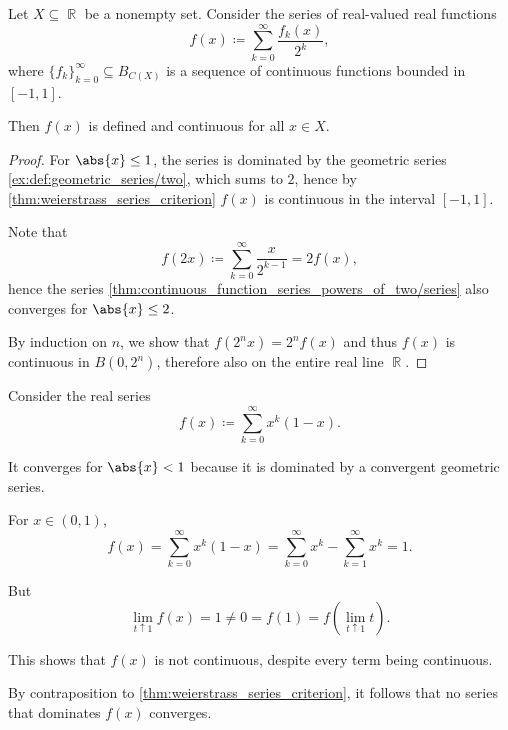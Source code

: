 \begin{corollary}\label{thm:continuous_function_series_powers_of_two}
  Let \( X \subseteq \BbbR \) be a nonempty set. Consider the series of real-valued real functions
  \begin{equation}\label{thm:continuous_function_series_powers_of_two/series}
    f(x) \coloneqq \sum_{k=0}^\infty \frac {f_k(x)} {2^k},
  \end{equation}
  where \( \{ f_k \}_{k=0}^\infty \subseteq B_{C(X)} \) is a sequence of continuous functions bounded in \( [-1, 1] \).

  Then \( f(x) \) is defined and continuous for all \( x \in X \).
\end{corollary}
\begin{proof}
  For \( \abs{x} \leq 1 \), the series is dominated by the geometric series \eqref{ex:def:geometric_series/two}, which sums to \( 2 \), hence by \cref{thm:weierstrass_series_criterion} \( f(x) \) is continuous in the interval \( [-1, 1] \).

  Note that
  \begin{equation*}
    f(2x) \coloneqq \sum_{k=0}^\infty \frac x {2^{k-1}} = 2 f(x),
  \end{equation*}
  hence the series \cref{thm:continuous_function_series_powers_of_two/series} also converges for \( \abs{x} \leq 2 \).

  By induction on \( n \), we show that \( f(2^n x) = 2^n f(x) \) and thus \( f(x) \) is continuous in \( B(0, 2^n) \), therefore also on the entire real line \( \BbbR \).
\end{proof}

\begin{example}\label{thm:weierstrass_series_criterion/counterexample}
  Consider the real series
  \begin{equation*}
    f(x) \coloneqq \sum_{k=0}^\infty x^k (1 - x).
  \end{equation*}

  It converges for \( \abs{x} < 1 \) because it is dominated by a convergent geometric series.

  For \( x \in (0, 1) \),
  \begin{equation*}
    f(x)
    =
    \sum_{k=0}^\infty x^k (1 - x)
    =
    \sum_{k=0}^\infty x^k - \sum_{k=1}^\infty x^k
    =
    1.
  \end{equation*}

  But
  \begin{equation*}
    \lim_{t \uparrow 1} f(x) = 1 \neq 0 = f(1) = f(\lim_{t \uparrow 1} t).
  \end{equation*}

  This shows that \( f(x) \) is not continuous, despite every term being continuous.

  By contraposition to \cref{thm:weierstrass_series_criterion}, it follows that no series that dominates \( f(x) \) converges.
\end{example}

